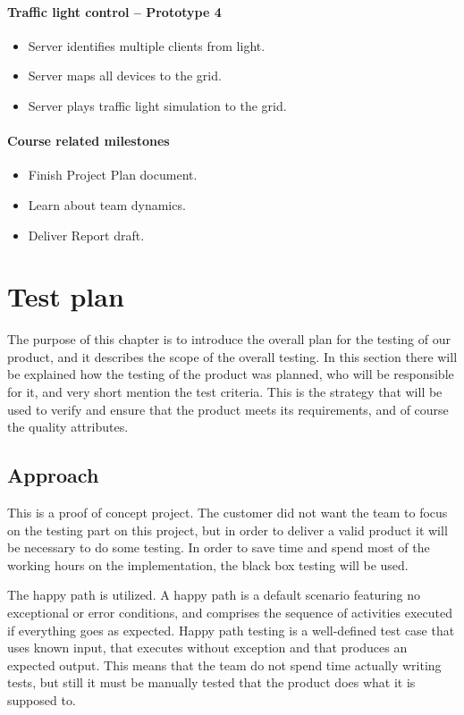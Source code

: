 \paragraph{Traffic light control -- Prototype 4}
\begin{itemize}
	\item Server identifies multiple clients from light.
	\item Server maps all devices to the grid.
	\item Server plays traffic light simulation to the grid.
\end{itemize}

\paragraph{Course related milestones}
\begin{itemize}
	\item Finish Project Plan document.
	\item Learn about team dynamics.
	\item Deliver Report draft.
\end{itemize}

\section{Test plan}
The purpose of this chapter is to introduce the overall plan for the testing of our product, and it describes the scope of the overall testing.
In this section there will be explained how the testing of the product was planned, who will be responsible for it, and very short mention the test criteria.
This is the strategy that will be used to verify and ensure that the product meets its requirements, and of course the quality attributes. 

\subsection{Approach}

This is a proof of concept project. The customer did not want the team to focus on the testing part on this project, but in order to deliver a valid product it will be necessary to do some testing. In order to save time and spend most of the working hours on the implementation, the black box testing will be used.  

The happy path is utilized. A happy path is a default scenario featuring no exceptional or error conditions, and comprises the sequence of activities executed if everything goes as expected. Happy path testing is a well-defined test case that uses known input, that executes without exception and that produces an expected output. This means that the team do not spend time actually writing tests, but still it must be manually tested that the product does what it is supposed to.

